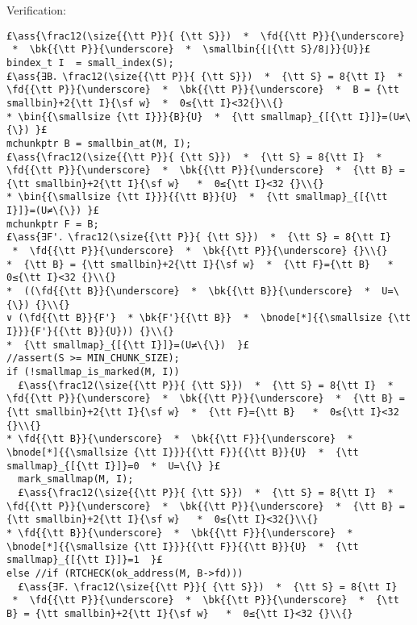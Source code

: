 \documentclass[10pt,twoside]{report}
\makeatletter
\newcommand{\ml}[2][t]{\mbox{\mdseries\begin{tabular}[#1]{@{}L@{}}#2\end{tabular}}}
\newcommand{\ass}[1]{\ensuremath{{\color{blue}\left\{\ml[c]{#1}\right\}}}}
\makeatother
\begin{document}
\noindent Verification:
\begin{lstlisting}
£\ass{\frac12(\size{{\tt P}}{ {\tt S}})  *  \fd{{\tt P}}{\underscore}  *  \bk{{\tt P}}{\underscore}  *  \smallbin{{⌊{\tt S}/8⌋}}{U}}£
bindex_t I  = small_index(S);
£\ass{∃B．\frac12(\size{{\tt P}}{ {\tt S}})  *  {\tt S} = 8{\tt I}  *  \fd{{\tt P}}{\underscore}  *  \bk{{\tt P}}{\underscore}  *  B = {\tt smallbin}+2{\tt I}{\sf w}  *  0≤{\tt I}<32{}\\{}
* \bin{{\smallsize {\tt I}}}{B}{U}  *  {\tt smallmap}_{[{\tt I}]}=(U≠\{\}) }£
mchunkptr B = smallbin_at(M, I);
£\ass{\frac12(\size{{\tt P}}{ {\tt S}})  *  {\tt S} = 8{\tt I}  *  \fd{{\tt P}}{\underscore}  *  \bk{{\tt P}}{\underscore}  *  {\tt B} = {\tt smallbin}+2{\tt I}{\sf w}   *  0≤{\tt I}<32 {}\\{}
* \bin{{\smallsize {\tt I}}}{{\tt B}}{U}  *  {\tt smallmap}_{[{\tt I}]}=(U≠\{\}) }£
mchunkptr F = B;
£\ass{∃F'．\frac12(\size{{\tt P}}{ {\tt S}})  *  {\tt S} = 8{\tt I}  *  \fd{{\tt P}}{\underscore}  *  \bk{{\tt P}}{\underscore} {}\\{}
*  {\tt B} = {\tt smallbin}+2{\tt I}{\sf w}  *  {\tt F}={\tt B}   *  0≤{\tt I}<32 {}\\{}
*  ((\fd{{\tt B}}{\underscore}  *  \bk{{\tt B}}{\underscore}  *  U=\{\}) {}\\{}
∨ (\fd{{\tt B}}{F'}  * \bk{F'}{{\tt B}}  *  \bnode[*]{{\smallsize {\tt I}}}{F'}{{\tt B}}{U})) {}\\{}
*  {\tt smallmap}_{[{\tt I}]}=(U≠\{\})  }£
//assert(S >= MIN_CHUNK_SIZE);
if (!smallmap_is_marked(M, I))
  £\ass{\frac12(\size{{\tt P}}{ {\tt S}})  *  {\tt S} = 8{\tt I}  *  \fd{{\tt P}}{\underscore}  *  \bk{{\tt P}}{\underscore}  *  {\tt B} = {\tt smallbin}+2{\tt I}{\sf w}  *  {\tt F}={\tt B}   *  0≤{\tt I}<32 {}\\{}
* \fd{{\tt B}}{\underscore}  *  \bk{{\tt F}}{\underscore}  *  \bnode[*]{{\smallsize {\tt I}}}{{\tt F}}{{\tt B}}{U}  *  {\tt smallmap}_{[{\tt I}]}=0  *  U=\{\} }£
  mark_smallmap(M, I);
  £\ass{\frac12(\size{{\tt P}}{ {\tt S}})  *  {\tt S} = 8{\tt I}  *  \fd{{\tt P}}{\underscore}  *  \bk{{\tt P}}{\underscore}  *  {\tt B} = {\tt smallbin}+2{\tt I}{\sf w}   *  0≤{\tt I}<32{}\\{}
* \fd{{\tt B}}{\underscore}  *  \bk{{\tt F}}{\underscore}  *  \bnode[*]{{\smallsize {\tt I}}}{{\tt F}}{{\tt B}}{U}  *  {\tt smallmap}_{[{\tt I}]}=1  }£
else //if (RTCHECK(ok_address(M, B->fd)))
  £\ass{∃F．\frac12(\size{{\tt P}}{ {\tt S}})  *  {\tt S} = 8{\tt I}  *  \fd{{\tt P}}{\underscore}  *  \bk{{\tt P}}{\underscore}  *  {\tt B} = {\tt smallbin}+2{\tt I}{\sf w}   *  0≤{\tt I}<32 {}\\{}

\end{lstlisting}
\end{document}
